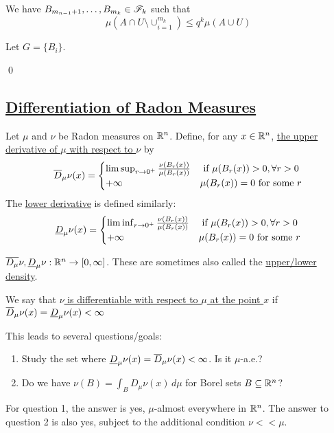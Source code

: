 \documentclass[x11names,reqno,14pt]{extarticle}
\begin{document}
We have $B_{m_{n - 1} + 1}, \dots, B_{m_k}\in\mathscr{F}_k$ such that
\[
\mu(A \cap U \setminus \cup_{i=1}^{m_k}) \leq q^k\mu(A \cup U)
\]

Let $G = \{B_i\}$. 



\qed

\subsection*{\underline{Differentiation of Radon Measures}}


Let $\mu$ and $\nu$ be Radon measures on $\mathbb{R}^n$. Define, for any $x \in \mathbb{R}^n$, 
\underline{the upper derivative of $\mu$ with respect to $\nu$} by
\[
\overline{D}_{\mu}\nu(x) = \begin{cases} \limsup_{r\to0^+}\frac{\nu(B_r(x))}{\mu(B_r(x))} & \text{ if }\mu(B_r(x)) > 0, \forall r > 0 \\ +\infty & \mu(B_r(x)) = 0\text{ for some }r\\
\end{cases}
\]
The \underline{lower derivative} is defined similarly:
\[
\underline{D}_{\mu}\nu(x) = \begin{cases} \liminf_{r\to0^+}\frac{\nu(B_r(x))}{\mu(B_r(x))} & \text{ if }\mu(B_r(x)) > 0, \forall r > 0 \\ +\infty & \mu(B_r(x)) = 0\text{ for some }r\\
\end{cases}
\]

$\overline{D_\mu}\nu, \underline{D}_\mu\nu:\mathbb{R}^n\to[0,\infty]$. These are sometimes also called the \underline{upper/lower density}. 

We say that \underline{$\nu$ is differentiable with respect to $\mu$ at the point $x$} if $\overline{D}_\mu\nu(x) = \underline{D}_\mu\nu(x) < \infty$

This leads to several questions/goals: 

\begin{enumerate}

\item Study the set where $\underline{D}_\mu\nu(x) = \overline{D}_\mu\nu(x) < \infty$. Is it $\mu$-a.e.?

\item Do we have $\nu(B) = \int_BD_\mu\nu(x)\,d\mu$ for Borel sets $B \subseteq\mathbb{R}^n$?

\end{enumerate}

For question 1, the answer is yes, $\mu$-almost everywhere in $\mathbb{R}^n$. The answer to question 2 is also yes, subject to the additional condition $\nu<<\mu$. 
\end{document}
